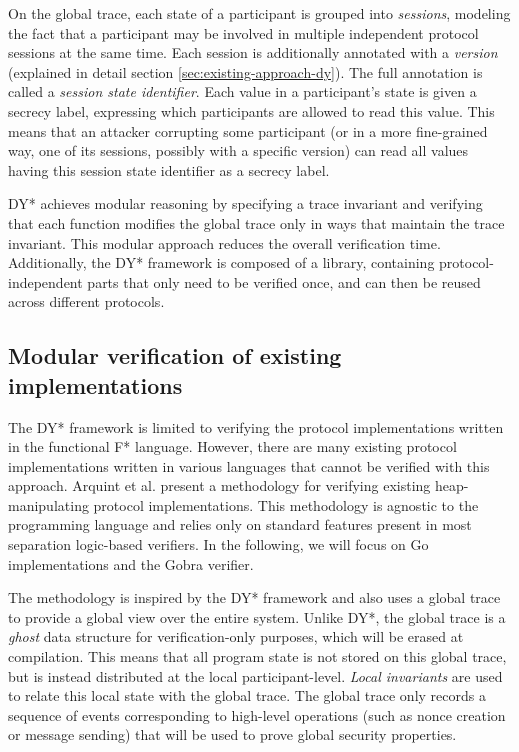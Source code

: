 \documentclass{article}
\begin{document}
On the global trace, each state of a participant is grouped into \textit{sessions}, modeling the fact that a participant may be involved in multiple independent protocol sessions at the same time.
Each session is additionally annotated with a \textit{version} (explained in detail section \ref*{sec:existing-approach-dy}). The full annotation is called a \textit{session state identifier}.
Each value in a participant's state is given a secrecy label, expressing which participants are allowed to read this value. This means that an attacker corrupting some participant (or in a more fine-grained way, one of its sessions, possibly with a specific version) can read all values having this session state identifier as a secrecy label.

DY* achieves modular reasoning by specifying a trace invariant and verifying that each function modifies the global trace only in ways that maintain the trace invariant. This modular approach reduces the overall verification time.
Additionally, the DY* framework is composed of a library, containing protocol-independent parts that only need to be verified once, and can then be reused across different protocols. 

\subsection{Modular verification of existing implementations}

The DY* framework is limited to verifying the protocol implementations written in the functional F* language. However, there are many existing protocol implementations written in various languages that cannot be verified with this approach.
Arquint et al.\cite{arquint2022generic} present a methodology for verifying existing heap-manipulating protocol implementations. This methodology is agnostic to the programming language and relies only on standard features present in most separation logic-based verifiers. In the following, we will focus on Go implementations and the Gobra\cite{wolf2021gobra} verifier.

The methodology is inspired by the DY* framework and also uses a global trace to provide a global view over the entire system.
Unlike DY*, the global trace is a \textit{ghost} data structure for verification-only purposes, which will be erased at compilation. This means that all program state is not stored on this global trace, but is instead distributed at the local participant-level. \textit{Local invariants} are used to relate this local state with the global trace.
The global trace only records a sequence of events corresponding to high-level operations (such as nonce creation or message sending) that will be used to prove global security properties.
\end{document}

